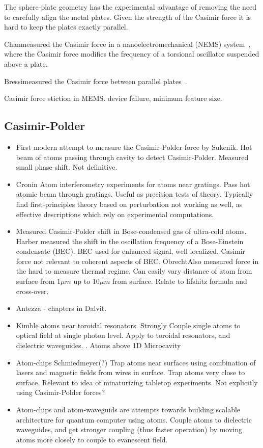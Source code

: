 The sphere-plate geometry has the experimental advantage of removing the need to carefully
align the metal plates.  Given the strength of the Casimir force it is hard to 
keep the plates exactly parallel.  

Chan\etal measured the Casimir force in a nanoelectromechanical (NEMS) system~\cite{Chan2001},
where the Casimir force modifies the frequency of a torsional oscillator suspended
above a plate.  

Bressi\etal measured the Casimir force between parallel plates~\cite{Bressi2002}.  

 Casimir force stiction in MEMS.  device failure, minimum feature size.~\cite{Buks2001}



\subsection{Casimir-Polder}
\begin{itemize}
\item First modern attempt to measure the Casimir-Polder force by Sukenik\etal\cite{Sukenik1993}.
  Hot beam of atoms passing through cavity to detect Casimir-Polder.  
  Measured small phase-shift.  Not definitive. 
\item Cronin \cite{Perreault2005,Lonij2009}  Atom interferometry experiments for atoms near gratings.
  Pass hot atomic beam through gratings.  Useful as precision tests of theory.  
  Typically find first-principles theory based on perturbation not working as well,
  as effective descriptions which rely on experimental computations.  
\item Measured Casimir-Polder shift in Bose-condensed gas of ultra-cold atoms.
  Harber\etal\cite{Harber2005} measured the shift in the oscillation frequency
  of a Bose-Einstein condensate (BEC).  BEC used for enhanced signal, well localized.
  Casimir force not relevant to coherent aspects of BEC.
  Obrecht\etal\cite{Obrecht2007}Also measured force in the hard to measure thermal regime.  
  Can easily vary distance of atom from surface from $1\mu m$ up to $10\mu m$ from surface.
  Relate to lifshitz formula and cross-over.    
\item Antezza - chapters in Dalvit.  
\item Kimble atoms near toroidal resonators.
  Strongly Couple single atoms to optical field at single photon level.  
  Apply to toroidal resonators, and dielectric waveguides.  
  \cite{Alton2011}.
  Atoms above 1D Microcavity \cite{Hung2013}
\item Atom-chips  Schmiedmeyer\cite{Folman2000,Schneider2003}(?)  
  Trap atoms near surfaces using combination of lasers and magnetic fields from
  wires in surface.  Trap atoms very close to surface.  Relevant to idea of 
  minaturizing tabletop experiments.  
  Not explicitly using Casimir-Polder forces?  
\item Atom-chips and atom-waveguids are attempts towards building scalable 
architecture for quantum computer using atoms.
Couple atoms to dielectric waveguides, and get stronger coupling (thus faster operation)
by moving atoms more closely to couple to evanescent field.  
\end{itemize}
